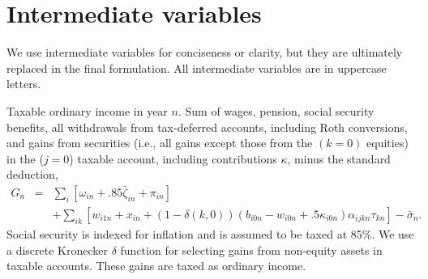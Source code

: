 \documentclass{report}[fleqn,12pt]
\begin{document}
\section{Intermediate variables}
We use intermediate variables for conciseness or clarity,
but they are ultimately replaced in the final formulation.
All intermediate variables are in uppercase letters.
\begin{description}[leftmargin=4em,style=multiline]
\item [$G_n$]
	Taxable ordinary income in year $n$. Sum of wages, pension, social security benefits, all withdrawals
	from tax-deferred accounts, including Roth conversions, and gains from securities
	(i.e., all gains except those from the $(k=0)$ equities)
	in the ($j=0$) taxable account, including contributions $\kappa$, minus the standard deduction,
	\begin{eqnarray}
		\label{Eq:Tx2}
		G_n &=& \sum_{i} [\omega_{in} + .85\bar\zeta_{in} + \pi_{in}] \nonumber \\
		&& + \sum_{ik} [w_{i1n} + x_{in} +
		(1-\delta(k, 0))(b_{i0n} - w_{i0n} + .5\kappa_{i0n})\alpha_{ijkn}\tau_{kn}] - \bar{\sigma}_n.
	\end{eqnarray}
	Social security is indexed for inflation and is assumed to be taxed at 85\%.
	We use a discrete Kronecker $\delta$ function for selecting gains from non-equity assets in
	taxable accounts. These gains are taxed as ordinary income.


\end{description}
\end{document}
